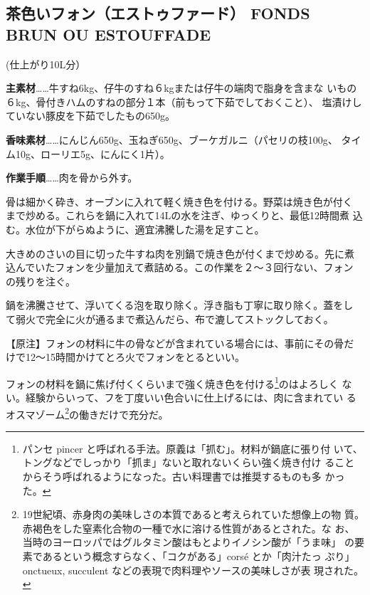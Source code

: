 \documentclass[twoside,12Q,b5paper,tombo]{escoffierltjsbook}
\newenvironment{recette}{\begin{multicols}{2}}{\end{multicols}}
\begin{document}
\begin{recette}

\subsection{茶色いフォン（エストゥファード） FONDS BRUN OU
ESTOUFFADE}\label{ux8336ux8272ux3044ux30d5ux30a9ux30f3ux30a8ux30b9ux30c8ux30a5ux30d5ux30a1ux30fcux30c9-fonds-brun-ou-estouffade}

(仕上がり10L分）

\textbf{主素材}\ldots{}\ldots{}牛すね6kg、仔牛のすね６kgまたは仔牛の端肉で脂身を含まな
いもの６kg、骨付きハムのすねの部分１本（前もって下茹でしておくこと）、
塩漬けしていない豚皮を下茹でしたもの650g。

\textbf{香味素材}\ldots{}\ldots{}にんじん650g、玉ねぎ650g、ブーケガルニ（パセリの枝100g、
タイム10g、ローリエ5g、にんにく1片）。

\textbf{作業手順}\ldots{}\ldots{}肉を骨から外す。

骨は細かく砕き、オーブンに入れて軽く焼き色を付ける。野菜は焼き色が付く
まで炒める。これらを鍋に入れて14Lの水を注ぎ、ゆっくりと、最低12時間煮
込む。水位が下がらぬように、適宜沸騰した湯を足すこと。

大きめのさいの目に切った牛すね肉を別鍋で焼き色が付くまで炒める。先に煮
込んでいたフォンを少量加えて煮詰める。この作業を２〜３回行ない、フォン
の残りを注ぐ。

鍋を沸騰させて、浮いてくる泡を取り除く。浮き脂も丁寧に取り除く。蓋をし
て弱火で完全に火が通るまで煮込んだら、布で漉してストックしておく。

【原注】フォンの材料に牛の骨などが含まれている場合には、事前にその骨だ
けで12〜15時間かけてとろ火でフォンをとるといい。

フォンの材料を鍋に焦げ付くくらいまで強く焼き色を付ける\footnote{パンセ
  pincer と呼ばれる手法。原義は「抓む」。材料が鍋底に張り付
  いて、トングなどでしっかり「抓ま」ないと取れないくらい強く焼き付け
  ることからそう呼ばれるようになった。古い料理書では推奨するものも多
  かった。}のはよろしく
ない。経験からいって、フを丁度いい色合いに仕上げるには、肉に含まれてい
るオスマゾーム\footnote{19世紀頃、赤身肉の美味しさの本質であると考えられていた想像上の物
  質。赤褐色をした窒素化合物の一種で水に溶ける性質があるとされた。な
  お、当時のヨーロッパではグルタミン酸はもとよりイノシン酸が「うま味」
  の要素であるという概念すらなく、「コクがある」corsé とか「肉汁たっ
  ぷり」onctueux, succulent などの表現で肉料理やソースの美味しさが表
  現された。}の働きだけで充分だ。


\end{recette}
\end{document}
